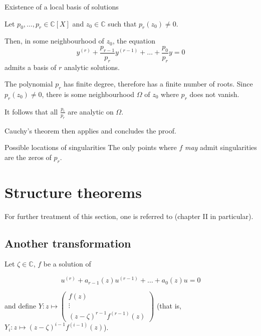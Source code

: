 \documentclass[../main.tex]{subfiles}
\begin{document}
\begin{thm}{Existence of a local basis of solutions}
	
	Let $p_0, \dots, p_r \in \mathbb{C}[X]$ and $z_0 \in \mathbb{C}$ such that $p_r (z_0) \neq 0$.
	
	Then, in some neighbourhood of $z_0$, the equation
	\begin{equation}
	y^{(r)} + \frac{p_{r-1}}{p_r} y^{(r - 1)} + \dots + \frac{p_0}{p_r} y = 0
	\end{equation}
	admits a basis of $r$ analytic solutions.
	
	\tcblower
	
	The polynomial $p_r$ has finite degree, therefore has a finite number of roots. Since $p_r(z_0) \neq 0$, there is some neighbourhood $\Omega$ of $z_0$ where $p_r$ does not vanish.
	
	It follows that all $\frac{p_i}{p_r}$ are analytic on $\Omega$.
	
	Cauchy's theorem then applies and concludes the proof.
\end{thm}

\begin{cor}{Possible locations of singularities}\label{cor_sing_location}
	The only points where $f$ \emph{may} admit singularities are the zeros of $p_r$.
\end{cor}


\section{Structure theorems}

For further treatment of this section, one is referred to \cite{Wasow1965} (chapter II in particular).

\subsection{Another transformation}

Let $\zeta \in \mathbb{C}$, $f$ be a solution of

\begin{equation*}
	u^{(r)} + a_{r - 1}(z) u^{(r - 1)} + \dots + a_0(z) u = 0
\end{equation*}

and define $Y : z \mapsto \begin{pmatrix}
f(z)\\
\vdots \\
{(z - \zeta)}^{r - 1} f^{(r - 1)}(z)
\end{pmatrix}$ (that is, $Y_i : z \mapsto {(z - \zeta)}^{i - 1} f^{(i - 1)}(z)$).
\end{document}

